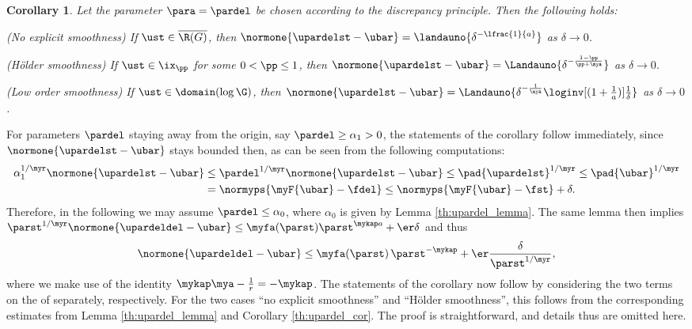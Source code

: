 \documentclass[10pt]{article}
\newtheorem{corollary}[theorem]{Corollary}
\theoremstyle{definition}
\begin{document}
%
\begin{corollary}
\label{th:upardel_cor_b}
\mainassump Let the parameter $ \para = \pardel $ be chosen according to the discrepancy principle. Then
the following holds:
%
\begin{mylist_indent}
\item (No explicit smoothness)
If $ \ust \in \overline{\R(G)} $, then
$ \normone{\upardelst - \ubar} = \landauno{\delta^{-\lfrac{1}{a}}} $
as $ \delta \to 0 $.
%
\item (H\"older smoothness)
If $ \ust \in \ix_\pp $ for some $ 0 < \pp \le 1 $, then
$ \normone{\upardelst - \ubar} = \Landauno{\delta^{-\frac{1-\pp}{\pp+\mya}}} $
as $ \delta \to 0 $.
\item (Low order smoothness)
If $ \ust \in \domain(\log \G) $, then
$ \normone{\upardelst - \ubar} = \Landauno{\delta^{-\frac{1}{\mya}} \loginv[(1+\frac{1}{a})]{\tfrac{1}{\delta}}} $
as $ \delta \to 0 $.
\end{mylist_indent}
\end{corollary}
\proof
For parameters $ \pardel $ staying away from the origin, say $ \pardel \ge \alpha_1 > 0 $, the statements of the corollary follow immediately, since $ \normone{\upardelst - \ubar} $ stays bounded then,
as can be seen from the following computations:
%
\begin{align*}
\alpha_1^{1/\myr} \normone{\upardelst - \ubar}
& \le \pardel^{1/\myr} \normone{\upardelst - \ubar}
\le \pad{\upardelst}^{1/\myr} \le
\pad{\ubar}^{1/\myr} \\
& = \normyps{\myF{\ubar} - \fdel }
\le \normyps{\myF{\ubar} - \fst } + \delta.
\end{align*}
%
%
Therefore, in the following we may assume
$ \pardel \le \alpha_0 $, where $ \alpha_0 $ is given by Lemma \ref{th:upardel_lemma}.
%
The same lemma then implies
$ \parst^{1/\myr} \normone{\upardeldel-\ubar}
\le \myfa(\parst)\parst^{\mykap a } + \er \delta $ and thus
%
\begin{align}
\normone{\upardeldel-\ubar}
\le \myfa(\parst)\,\parst^{-\mykap } + \er \frac{\delta}{\parst^{1/\myr}},
\label{eq:upardel_cor_b1}
\end{align}
%
where we make use of the identity $ \mykap \mya - \frac{1}{r} = -\mykap $.
The statements of the corollary now follow by considering the two terms on the \rhs of
 separately, respectively.
For the two cases ``no explicit smoothness'' and ``H\"older smoothness'', this follows from the corresponding estimates from Lemma \ref{th:upardel_lemma} and Corollary \ref{th:upardel_cor}. The proof is straightforward, and details thus are omitted here.
\end{document}
